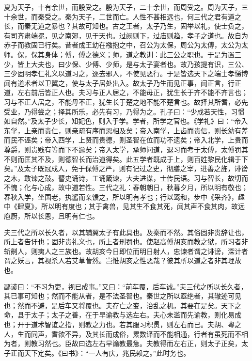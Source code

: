 \documentclass[12pt,UTF8]{ctexbook}
\begin{document}
夏为天子，十有余世，而殷受之。殷为天子，二十余世，而周受之。周为天子，三十余世，而秦受之。秦为天子，二世而亡。人性不甚相远也，何三代之君有道之长，而秦无道之暴也？其故可知也。古之王者，太子乃生，固举以礼，使士负之，有司齐肃端冕，见之南郊，见于天也。过阙则下，过庙则趋，孝子之道也。故自为赤子而教固已行矣。昔者成王幼在襁抱之中，召公为太保，周公为太傅，太公为太师。保，保其身体；傅，傅之德义；师，道之教训：此三公之职也。于是为置三少，皆上大夫也，曰少保、少傅、少师，是与太子宴者也。故乃孩提有识，三公、三少固明孝仁礼义以道习之，逐去邪人，不使见恶行。于是皆选天下之端士孝悌博闻有道术者以卫翼之，使与太子居处出入。故太子乃生而见正事，闻正言，行正道，左右前后皆正人也。夫习与正人居之，不能毋正，犹生长于齐不能不齐言也；习与不正人居之，不能毋不正，犹生长于楚之地不能不楚言也。故择其所耆，必先受业，乃得尝之；择其所乐，必先有习，乃得为之。孔子曰：“少成若天性，习惯如自然。”及太子少长，知妃色，则入于学。学者，所学之官也。《学礼》曰：“帝入东学，上亲而贵仁，则亲疏有序而恩相及矣；帝入南学，上齿而贵信，则长幼有差而民不诬矣；帝入西学，上贤而贵德，则圣智在位而功不遗矣；帝入北学，上贵而尊爵，则贵贱有等而下不逾矣；帝入太学，承师问道，退习而考于太傅，太傅罚其不则而匡其不及，则德智长而治道得矣。此五学者既成于上，则百姓黎民化辑于下矣。”及太子既冠成人，免于保傅之严，则有记过之史，彻膳之宰，进善之旌，诽谤之木，敢谏之鼓。瞽史诵诗，工诵箴谏，大夫进谋，士传民语。习与智长，故切而不愧；化与心成，故中道若性。三代之礼：春朝朝日，秋暮夕月，所以明有敬也；春秋入学，坐国老，执酱而亲馈之，所以明有孝也；行以鸾和，步中《采齐》，趣中《肆夏》，所以明有度也；其于禽兽，见其生不食其死，闻其声不食其肉，故远庖厨，所以长恩，且明有仁也。



夫三代之所以长久者，以其辅翼太子有此具也。及秦而不然。其俗固非贵辞让也，所上者告讦也；固非贵礼义也，所上者刑罚也。使赵高傅胡亥而教之狱，所习者非斩劓人，则夷人之三族也。故胡亥今日即位而明日射人，忠谏者谓之诽谤，深计者谓之妖言，其视杀人若艾草菅然。岂惟胡亥之性恶哉？彼其所以道之者非其理故也。



鄙谚曰：“不习为吏，视已成事。”又曰：“前车覆，后车诚。”夫三代之所以长久者，其已事可知也；然而不能从者，是不法圣智也。秦世之所以亟绝者，其辙迹可见也；然而不避，是后车又将覆也。夫存亡之变，治乱之机，其要在是矣。天下之命，县于太子；太子之善，在于早谕教与选左右。夫心未滥而先谕教，则化易成也；开于道术智谊之指，则教之力也。若其服习积贯，则左右而已。夫胡、粤之人，生而同声，耆欲不异，及其长而成俗，累数译而不能相通，行者有虽死而不相为者，则教习然也。臣故曰选左右早谕教最急。夫教得而左右正，则太子正矣，太子正而天下定矣。《曰书》：“一人有庆，兆民赖之。”此时务也。
\end{document}
